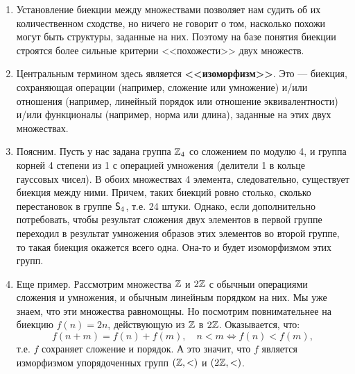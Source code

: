 \begin{enumerate}
\item Установление биекции между множествами позволяет нам судить об их количественном сходстве, но ничего не говорит о том, насколько похожи могут быть структуры, заданные на них. Поэтому на базе понятия биекции строятся более сильные критерии <<похожести>> двух множеств.
\item Центральным термином здесь является \textbf{<<изоморфизм>>}. Это --- биекция, сохраняющая операции (например, сложение или умножение) и/или отношения (например, линейный порядок или отношение эквивалентности) и/или функционалы (например, норма или длина), заданные на этих двух множествах.
\item Поясним. Пусть у нас задана группа $\mathbb Z_4$ со сложением по модулю 4, и группа корней 4 степени из 1 с операцией умножения (делители 1 в кольце гауссовых чисел). В обоих множествах 4 элемента, следовательно, существует биекция между ними. Причем, таких биекций ровно столько, сколько перестановок в группе ${\mathsf{S}}_4$, т.е. 24 штуки. Однако, если дополнительно потребовать, чтобы результат сложения двух элементов в первой группе переходил в результат умножения образов этих элементов во второй группе, то такая биекция окажется всего одна. Она-то и будет изоморфизмом этих групп.
\item Еще пример. Рассмотрим множества $\mathbb Z$ и $2\mathbb Z$ с обычныи операциями сложения и умножения, и обычным линейным порядком на них. Мы уже знаем, что эти множества равномощны. Но посмотрим повнимательнее на биекцию $f(n)=2n$, действующую из $\mathbb Z$ в $2\mathbb Z$. Оказывается, что:
$$
f(n+m)=f(n)+f(m),\quad n<m\Leftrightarrow f(n)<f(m),
$$
т.е. $f$ сохраняет сложение и порядок. А это значит, что $f$ является изморфизмом упорядоченных групп $(\mathbb Z,<)$ и $(2\mathbb Z,<)$.


\end{enumerate}
